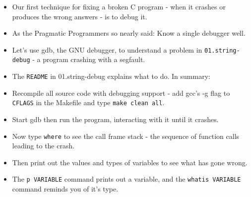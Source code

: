 \documentclass[aspectratio=169]{beamer}
\begin{document}
\begin{frame}[fragile]
    \begin{itemize}
      \item
      Our first technique for fixing a broken C program - when it crashes or produces
      the wrong answers - is to \alert{debug it}.
      \item
      As the Pragmatic Programmers so nearly said: \alert{Know a single debugger well}.
    \pause
      \item
      Let's use \alert{gdb}, the GNU debugger, to understand a problem in
      \verb+01.string-debug+ - a program crashing with a segfault.
    \pause
      \item
      The \verb+README+ in 01.string-debug explains what to do.  In summary:
      \item
      \alert{Recompile all source code with debugging support} - add gcc's
      \alert{-g} flag to \verb+CFLAGS+ in the Makefile and type \verb+make clean all+.
    \pause
      \item
      \alert{Start gdb} then run the program, interacting with it \alert{until it crashes}.
      \item
      Now type \verb+where+ to see
      \alert{the call frame stack} - the sequence of
      function calls leading to the crash.
    \pause
      \item
      Then print out the values and types of variables to see what has gone wrong.
      \item
      The \verb+p VARIABLE+ command prints out a variable, and the
      \verb+whatis VARIABLE+ command reminds you of it's type.
    \end{itemize}
\end{frame}
\end{document}
